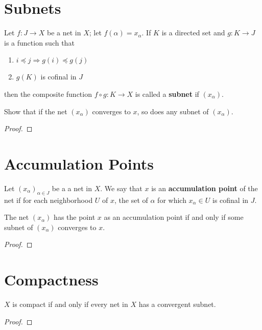 \documentclass[12pt]{article}
\begin{document}
\section{Subnets}
\begin{defn}
    Let $f: J \to X$ be a net in $X$; let $f(\alpha) = x_\alpha$. If $K$ is a directed set and $g:
        K \to J$ is a function such that
    \begin{enumerate}
        \item $i \preceq j \Rightarrow g(i) \preceq g(j)$
        \item $g(K)$ is cofinal in $J$
    \end{enumerate}
    then the composite function $f \circ g : K \to X$ is called a \textbf{subnet} if $(x_\alpha)$.
\end{defn}

Show that if the net $(x_\alpha)$ converges to $x$, so does any subnet of $(x_\alpha)$.
\begin{proof}
\end{proof}

\section{Accumulation Points}
\begin{defn}
    Let ${(x_\alpha)}_{\alpha\in J}$ be a a net in $X$. We say that $x$ is an \textbf{accumulation
        point} of the net if for each neighborhood $U$ of $x$, the set of $\alpha$ for which
    $x_\alpha \in U$ is cofinal in $J$.
\end{defn}

\begin{lemma}
    The net $(x_\alpha)$ has the point $x$ as an accumulation point if and only if some subnet of
    $(x_\alpha)$ converges to $x$.
\end{lemma}
\begin{proof}
\end{proof}

\section{Compactness}
\begin{thm}
    $X$ is compact if and only if every net in $X$ has a convergent subnet.
\end{thm}
\begin{proof}
\end{proof}
\end{document}
